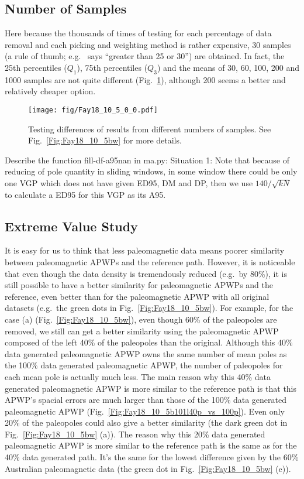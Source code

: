 \subsection{Number of Samples}
Here because the thousands of times of testing for each percentage of data
removal and each picking and weighting method is rather expensive, 30 samples
(a rule of thumb; e.g.~\cite{H19} says ``greater than 25 or 30'') are obtained.
In fact, the 25th percentiles ($Q_1$), 75th percentiles ($Q_3$) and the means of
30, 60, 100, 200 and 1000 samples are not quite different
(Fig.~\ref{Fig:Fay18_10_5_0_0}), although 200 seems a better and relatively
cheaper option.

\begin{figure}
    \centering
        \texttt{[image: fig/Fay18\_10\_5\_0\_0.pdf]}
    \captionsetup{width=.95\textwidth}
    \caption{Testing differences of results from different numbers of samples.
	See Fig.~\ref{Fig:Fay18_10_5bw} for more details.}\label{Fig:Fay18_10_5_0_0}
\end{figure}

Describe the function fill-df-a95nan in ma.py:
Situation 1: Note that because of reducing of pole quantity in sliding windows,
in some window there could be only one VGP which does not have given ED95, DM
and DP, then we use $140/\sqrt{kN}$~\cite{T91,T19} to calculate a ED95 for this
VGP as its A95.

\subsection{Extreme Value Study}

It is easy for us to think that less paleomagnetic data means poorer similarity
between paleomagnetic APWPs and the reference path. However, it is noticeable
that even though the data density is tremendously reduced (e.g.\ by 80\%), it is
still possible to have a better similarity for paleomagnetic APWPs and the
reference, even better than for the paleomagnetic APWP with all original
datasets (e.g.\ the green dots in Fig.~\ref{Fig:Fay18_10_5bw}). For example,
for the case (a) (Fig.~\ref{Fig:Fay18_10_5bw}), even though 60\% of the
paleopoles are removed, we still can get a better similarity using the
paleomagnetic APWP composed of the left 40\% of the paleopoles than the
original. Although this 40\% data generated paleomagnetic APWP owns the same
number of mean poles as the 100\% data generated paleomagnetic APWP, the
number of paleopoles for each mean pole is actually much less. The main reason
why this 40\% data generated paleomagnetic APWP is more similar to the
reference path is that this APWP's spacial errors are much larger than those of
the 100\% data generated paleomagnetic APWP
(Fig.~\ref{Fig:Fay18_10_5b101l40p_vs_100p}). Even only 20\% of the paleopoles
could also give a better similarity (the dark green dot in
Fig.~\ref{Fig:Fay18_10_5bw} (a)). The reason why this 20\% data generated
paleomagnetic APWP is more similar to the reference path is the same as for the
40\% data generated path. It's the same for the lowest difference given by the
60\% Australian paleomagnetic data (the green dot in Fig.~\ref{Fig:Fay18_10_5bw}
(e)).

